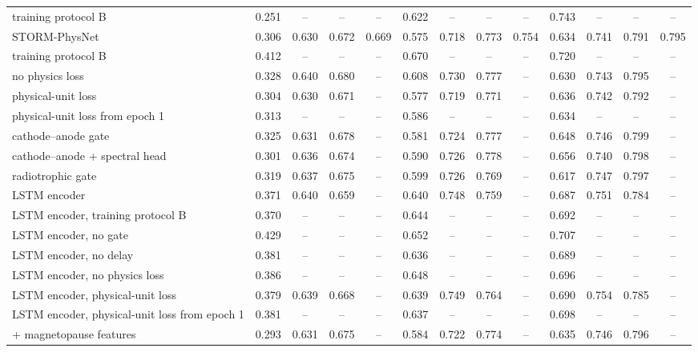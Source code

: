 \begin{table}[!t]
\begin{adjustbox}{max width=\linewidth}
\begin{tabular}{lcccccccccccc}
\quad training protocol B & 0.251 & -- & -- & -- & 0.622 & -- & -- & -- & 0.743 & -- & -- & -- \\
STORM-PhysNet & 0.306 & 0.630 & 0.672 & 0.669 & 0.575 & 0.718 & 0.773 & 0.754 & 0.634 & 0.741 & 0.791 & 0.795 \\
\quad training protocol B & 0.412 & -- & -- & -- & 0.670 & -- & -- & -- & 0.720 & -- & -- & -- \\
\quad no physics loss & 0.328 & 0.640 & 0.680 & -- & 0.608 & 0.730 & 0.777 & -- & 0.630 & 0.743 & 0.795 & -- \\
\quad physical-unit loss & 0.304 & 0.630 & 0.671 & -- & 0.577 & 0.719 & 0.771 & -- & 0.636 & 0.742 & 0.792 & -- \\
\quad physical-unit loss from epoch 1 & 0.313 & -- & -- & -- & 0.586 & -- & -- & -- & 0.634 & -- & -- & -- \\
\quad cathode--anode gate & 0.325 & 0.631 & 0.678 & -- & 0.581 & 0.724 & 0.777 & -- & 0.648 & 0.746 & 0.799 & -- \\
\quad cathode--anode + spectral head & 0.301 & 0.636 & 0.674 & -- & 0.590 & 0.726 & 0.778 & -- & 0.656 & 0.740 & 0.798 & -- \\
\quad radiotrophic gate & 0.319 & 0.637 & 0.675 & -- & 0.599 & 0.726 & 0.769 & -- & 0.617 & 0.747 & 0.797 & -- \\
\quad LSTM encoder & 0.371 & 0.640 & 0.659 & -- & 0.640 & 0.748 & 0.759 & -- & 0.687 & 0.751 & 0.784 & -- \\
\quad LSTM encoder, training protocol B & 0.370 & -- & -- & -- & 0.644 & -- & -- & -- & 0.692 & -- & -- & -- \\
\quad LSTM encoder, no gate & 0.429 & -- & -- & -- & 0.652 & -- & -- & -- & 0.707 & -- & -- & -- \\
\quad LSTM encoder, no delay & 0.381 & -- & -- & -- & 0.636 & -- & -- & -- & 0.689 & -- & -- & -- \\
\quad LSTM encoder, no physics loss & 0.386 & -- & -- & -- & 0.648 & -- & -- & -- & 0.696 & -- & -- & -- \\
\quad LSTM encoder, physical-unit loss & 0.379 & 0.639 & 0.668 & -- & 0.639 & 0.749 & 0.764 & -- & 0.690 & 0.754 & 0.785 & -- \\
\quad LSTM encoder, physical-unit loss from epoch 1 & 0.381 & -- & -- & -- & 0.637 & -- & -- & -- & 0.698 & -- & -- & -- \\
\quad + magnetopause features & 0.293 & 0.631 & 0.675 & -- & 0.584 & 0.722 & 0.774 & -- & 0.635 & 0.746 & 0.796 & -- \\
\bottomrule
\end{tabular}
\end{adjustbox}

\par\vspace{0.5ex}{\footnotesize\raggedright Zero: zero-shot, no retraining. Heads: encoder frozen, output layers retrained. Full: all weights fine-tuned. Scr.: trained from scratch on the target satellite only. ``--'': not run (zero-shot only for these models).\par}
\end{table}
